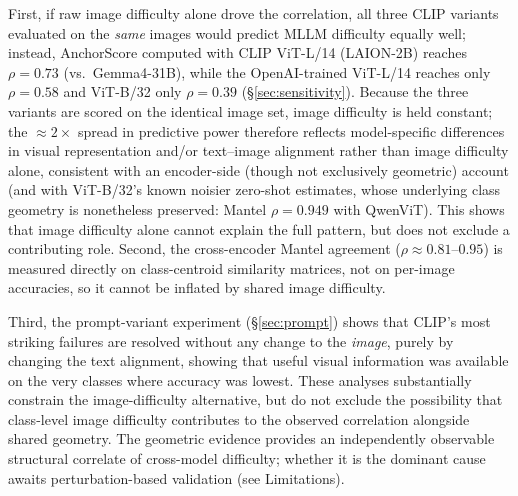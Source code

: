 \documentclass[a4paper,fleqn]{cas-sc}
\begin{document}
 First, if raw image difficulty alone drove the correlation, all three CLIP variants evaluated on the \emph{same} images would predict MLLM difficulty equally well; instead, AnchorScore computed with CLIP ViT-L/14 (LAION-2B) reaches $\rho=0.73$ (vs.\ Gemma4-31B), while the OpenAI-trained ViT-L/14 reaches only $\rho=0.58$ and ViT-B/32 only $\rho=0.39$ (\S\ref{sec:sensitivity}). Because the three variants are scored on the identical image set, image difficulty is held constant; the $\approx 2\times$ spread in predictive power therefore reflects model-specific differences in visual representation and/or text--image alignment rather than image difficulty alone, consistent with an encoder-side (though not exclusively geometric) account (and with ViT-B/32's known noisier zero-shot estimates, whose underlying class geometry is nonetheless preserved: Mantel $\rho=0.949$ with QwenViT). This shows that image difficulty alone cannot explain the full pattern, but does not exclude a contributing role. Second, the cross-encoder Mantel agreement ($\rho\approx0.81$--$0.95$) is measured directly on class-centroid similarity matrices, not on per-image accuracies, so it cannot be inflated by shared image difficulty.

 Third, the prompt-variant experiment (\S\ref{sec:prompt}) shows that CLIP's most striking failures are resolved without any change to the \emph{image}, purely by changing the text alignment, showing that useful visual information was available on the very classes where accuracy was lowest. These analyses substantially constrain the image-difficulty alternative, but do not exclude the possibility that class-level image difficulty contributes to the observed correlation alongside shared geometry. The geometric evidence provides an independently observable structural correlate of cross-model difficulty; whether it is the dominant cause awaits perturbation-based validation (see Limitations).
\end{document}
